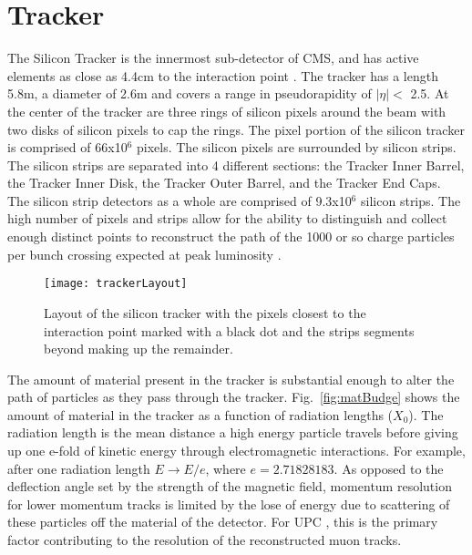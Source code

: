   \section{Tracker}
    The Silicon Tracker is the innermost sub-detector of CMS, and has active
    	elements as close as 4.4cm to the interaction point \cite{tCmsE}. 
    The tracker has a length 5.8m, a diameter of 2.6m and
    	covers a range in pseudorapidity of \(|\eta| <\) 2.5.
    At the center of the tracker are three rings of silicon pixels around the beam 
    	with two disks of silicon pixels to cap the rings.
    The pixel portion of the silicon tracker is comprised of 66x10$^{6}$
    	pixels.
    The silicon pixels are surrounded by silicon strips.
    The silicon strips are separated into 4 different sections: 
    	the Tracker Inner Barrel, the Tracker Inner Disk, the Tracker Outer 
    	Barrel, and the Tracker End Caps.
    The silicon strip detectors as a whole are comprised of 9.3x10$^{6}$ silicon 
    	strips.
    The high number of pixels and strips allow for the ability to distinguish
    	and collect enough distinct points to reconstruct the path of the 1000
    	or so charge particles per bunch crossing expected at peak luminosity
    	\cite{tCmsE}.

    \begin{figure}[!Hhbt]
      \centering
      \texttt{[image: trackerLayout]}
      \caption{Layout of the silicon tracker with the pixels closest to the 
        interaction point marked with a black dot and the strips segments 
        beyond making up the remainder.}
      \label{fig:fig:trackerLayout}
    \end{figure}

    The amount of material present in the tracker is substantial enough to
      alter the path of particles as they pass through the tracker. 
    Fig.~\ref{fig:matBudge} shows the amount of material in the tracker 
      as a function of radiation lengths ($X_{0}$).
    The radiation length is the mean distance a high energy particle travels 
      before giving up one e-fold of kinetic energy through electromagnetic
    	interactions.
    For example, after one radiation length $E \rightarrow E/e$, where 
    	$e = 2.71828183$. 
    As opposed to the deflection angle set by the strength of the magnetic 
      field, momentum resolution for lower momentum tracks is limited by the 
      lose of energy due to scattering of these particles off the material of 
      the detector.
    For UPC \JPsi{}, this is the primary factor contributing to the resolution 
      of the reconstructed muon tracks. 
  
